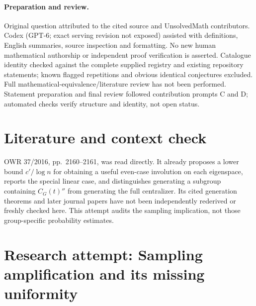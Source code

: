 \documentclass[11pt]{article}
\begin{document}
\paragraph{Preparation and review.}
Original question attributed to the cited source and UnsolvedMath contributors. Codex (GPT-6; exact serving revision not exposed) assisted with definitions, English summaries, source inspection and formatting. No new human mathematical authorship or independent proof verification is asserted. Catalogue identity checked against the complete supplied registry and existing repository statements; known flagged repetitions and obvious identical conjectures excluded. Full mathematical-equivalence/literature review has not been performed. Statement preparation and final review followed contribution prompts C and D; automated checks verify structure and identity, not open status.
\label{end:statement}

\section{Literature and context check}
OWR 37/2016, pp.~2160--2161, was read directly. It already proposes a lower bound $c'/\log n$ for obtaining a useful even-case involution on each eigenspace, reports the special linear case, and distinguishes generating a subgroup containing $C_G(t)''$ from generating the full centralizer. Its cited generation theorems and later journal papers have not been independently rederived or freshly checked here. This attempt audits the sampling implication, not those group-specific probability estimates.
\section{Research attempt: Sampling amplification and its missing uniformity}
\end{document}
